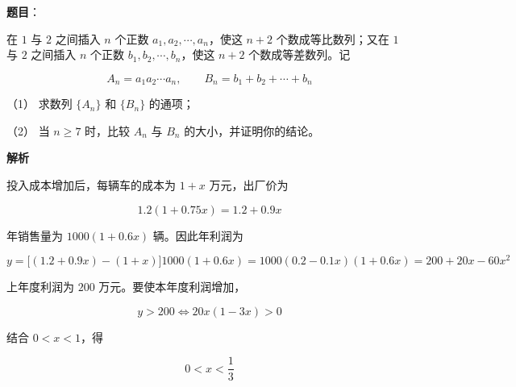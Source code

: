 \begin{answer}

\textbf{题目}：

在 $1$ 与 $2$ 之间插入 $n$ 个正数 $a_1,a_2,\cdots,a_n$，使这 $n+2$ 个数成等比数列；又在 $1$ 与 $2$ 之间插入 $n$ 个正数 $b_1,b_2,\cdots,b_n$，使这 $n+2$ 个数成等差数列。记

\nopagebreak[4]
\[
A_n=a_1a_2\cdots a_n,\qquad B_n=b_1+b_2+\cdots+b_n
\]

（1） 求数列 $\{A_n\}$ 和 $\{B_n\}$ 的通项；

（2） 当 $n\ge7$ 时，比较 $A_n$ 与 $B_n$ 的大小，并证明你的结论。

\textbf{解析}


投入成本增加后，每辆车的成本为 $1+x$ 万元，出厂价为

\nopagebreak[4]
\[
1.2(1+0.75x)=1.2+0.9x
\]

年销售量为 $1000(1+0.6x)$ 辆。因此年利润为

\nopagebreak[4]
\[
y=\bigl[(1.2+0.9x)-(1+x)\bigr]1000(1+0.6x)
=1000(0.2-0.1x)(1+0.6x)
=200+20x-60x^2
\]


上年度利润为 $200$ 万元。要使本年度利润增加，

\nopagebreak[4]
\[
y>200
\Longleftrightarrow
20x(1-3x)>0
\]

结合 $0<x<1$，得

\nopagebreak[4]
\[
0<x<\frac13
\]



\end{answer}
